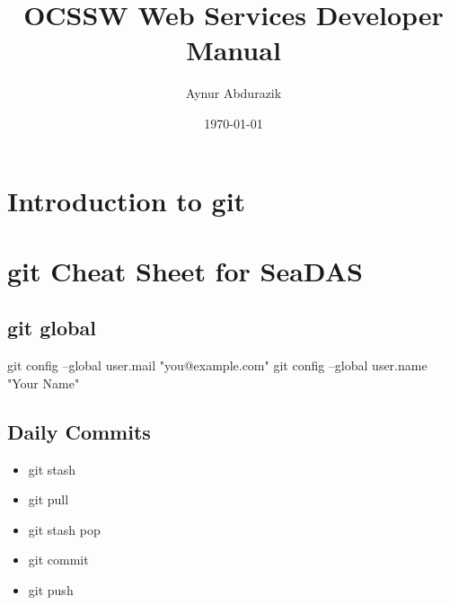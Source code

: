 \documentclass[11pt, oneside]{article}   	%
\title{OCSSW Web Services Developer Manual}
\author{Aynur Abdurazik}
\date{\today}							%
\begin{document}
\maketitle

\section{Introduction to git}

\section{git Cheat Sheet for SeaDAS}

\subsection{git global}
git config --global user.mail "you@example.com"
git config --global user.name "Your Name"

 \subsection{Daily Commits}
 \begin{itemize}
 \item git stash
 \item git pull
 \item git stash pop
 \item git commit
 \item git push
 \end{itemize}
\end{document}

